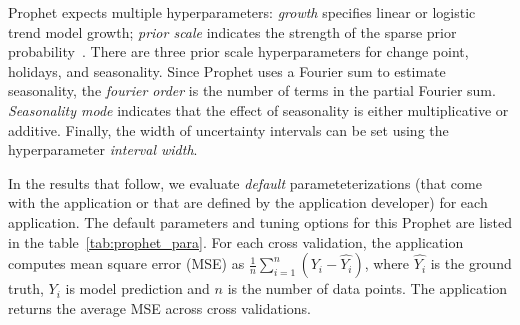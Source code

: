 
Prophet expects multiple hyperparameters: \textit{growth} specifies linear or logistic trend model growth; \textit{prior scale} indicates the strength of the 
sparse prior probability~\cite{ref:sparse_prior}. 
There are three prior scale hyperparameters for change point, holidays, and seasonality. 
Since Prophet uses a Fourier sum to estimate seasonality, 
the \textit{fourier order} is the number of terms in the partial Fourier 
sum. \textit{Seasonality mode} indicates that the effect of seasonality is either 
multiplicative or additive. Finally, the width of uncertainty intervals 
can be set using the hyperparameter \textit{interval width}.

In the results that follow, we evaluate \textit{default} parameteterizations (that come with 
the application or that are defined by the application developer) for each application.  
The default parameters and tuning options for this Prophet are listed in the table~\ref{tab:prophet_para}. For each cross validation, the application computes mean square error (MSE) as $\frac{1}{n}\sum_{i=1}^{n}(Y_i - \hat{Y_i})$, where $\hat{Y_i}$ is the ground truth, $Y_i$ is model prediction and $n$ is the number of data points. The application returns the average MSE across cross validations. 

\begin{table}[t]
\centering
\scriptsize
{}
\caption{Default hyperparameters for Prophet. The default value and tuning options are listed. 
\label{tab:prophet_para}}
\vspace{-0.2in}
\end{table}

